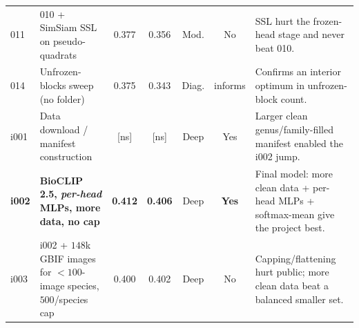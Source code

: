 \begin{table}[t]
\begin{tabularx}{\linewidth}{@{}l l c c c c X@{}}
011 & 010 + SimSiam SSL on pseudo-quadrats & 0.377 & 0.356 & Mod. & No & SSL hurt the frozen-head stage and never beat 010. \\
014 & Unfrozen-blocks sweep (no folder) & 0.375 & 0.343 & Diag. & informs & Confirms an interior optimum in unfrozen-block count. \\
i001 & Data download / manifest construction & [ns] & [ns] & Deep & Yes & Larger clean genus/family-filled manifest enabled the i002 jump. \\
\textbf{i002} & \textbf{BioCLIP 2.5, \emph{per-head} MLPs, more data, no cap} & \textbf{0.412} & \textbf{0.406} & Deep & \textbf{Yes} & Final model: more clean data + per-head MLPs + softmax-mean give the project best. \\
i003 & i002 + $148$k GBIF images for $<\!100$-image species, $500$/species cap & 0.400 & 0.402 & Deep & No & Capping/flattening hurt public; more clean data beat a balanced smaller set. \\
\bottomrule
\end{tabularx}
\end{table}

